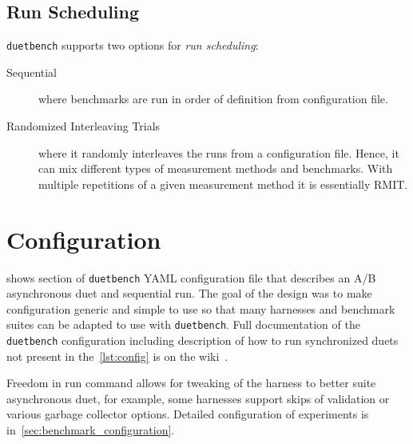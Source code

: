 \subsection{Run Scheduling}
\label{sec:scheduling}

\lstinline{duetbench} supports two options for \emph{run scheduling}:
\begin{description}
    \item[Sequential] where benchmarks are run in order of definition from configuration file.
    \item[Randomized Interleaving Trials] where it randomly interleaves the runs from a configuration file.
        Hence, it can mix different types of measurement methods and benchmarks.
        With multiple repetitions of a given measurement method it is essentially RMIT\cite{abedi2017conducting}.
\end{description}

\section{Configuration}
\label{sec:configuration}

 shows section of \lstinline{duetbench} YAML configuration file that describes an A/B asynchronous duet and sequential run.
The goal of the design was to make configuration generic and simple to use so that many harnesses and benchmark suites can be adapted to use with \lstinline{duetbench}.
Full documentation of the \lstinline{duetbench} configuration including description of how to run synchronized duets not present in the~\cref{lst:config} is on the wiki~\cite{wiki}.

Freedom in run command allows for tweaking of the harness to better suite asynchronous duet, for example, some harnesses support skips of validation or various garbage collector options.
Detailed configuration of experiments is in~\cref{sec:benchmark_configuration}.

